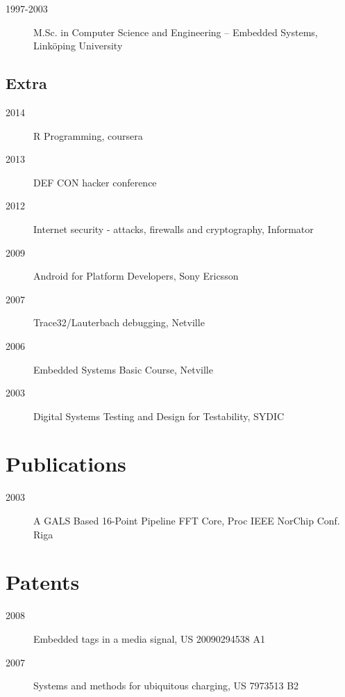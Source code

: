\documentclass[ DIV=calc,%
                paper=a4,%
                fontsize=11pt,%
                twocolumn]{scrartcl}
\begin{document}
\begin{description}
    \item[1997-2003] M.Sc. in Computer Science and Engineering – Embedded Systems, Linköping University
\end{description}

\subsection*{Extra}

\begin{description}
    \item[2014] R Programming, coursera
    \item[2013] DEF CON hacker conference
    \item[2012] Internet security - attacks, firewalls and cryptography, Informator
    \item[2009] Android for Platform Developers, Sony Ericsson
    \item[2007] Trace32/Lauterbach debugging, Netville
    \item[2006] Embedded Systems Basic Course, Netville
    \item[2003] Digital Systems Testing and Design for Testability, SYDIC
\end{description}

\section*{Publications}

\begin{description}
    \item[2003] A GALS Based 16-Point Pipeline FFT Core, Proc IEEE NorChip Conf. Riga
\end{description}

\section*{Patents}

\begin{description}
    \item[2008] Embedded tags in a media signal, US 20090294538 A1
    \item[2007] Systems and methods for ubiquitous charging, US 7973513 B2
\end{description}
\end{document}
